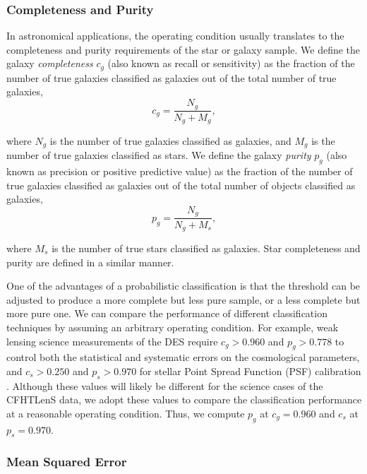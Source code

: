\documentclass[fleqn,usenatbib]{mnras}
\begin{document}
\subsubsection{Completeness and Purity}

In astronomical applications,
the operating condition usually translates to
the completeness and purity requirements of the star or galaxy sample.
We define the galaxy \textit{completeness}
$c_g$ (also known as recall or sensitivity) as
the fraction of the number of true galaxies classified as galaxies
out of the total number of true galaxies,
\begin{equation}
c_g = \frac{N_g}{N_g + M_g},
\end{equation}

\noindent
where $N_g$ is the number of true galaxies classified as galaxies,
and $M_g$ is the number of true galaxies classified as stars.
We define the galaxy \textit{purity} $p_g$ (also known as precision
or positive predictive value)
as the fraction of the number of true galaxies classified as galaxies
out of the total number of objects classified as galaxies, 
\begin{equation}
p_g = \frac{N_g}{N_g + M_s},
\end{equation}

\noindent
where $M_s$ is the number of true stars classified as galaxies.
Star completeness and purity are defined in a similar manner.


One of the advantages of a probabilistic classification is
that the threshold can be adjusted to produce
a more complete but less pure sample,
or a less complete but more pure one.
We can compare the performance of different classification techniques
by assuming an arbitrary operating condition.
For example, weak lensing science measurements
of the DES require $c_g > 0.960$ and $p_g > 0.778$
to control both the statistical and systematic errors
on the cosmological parameters,
and $c_s > 0.250$ and $p_s > 0.970$
for stellar Point Spread Function (PSF) calibration
\citep{soumagnac2013star}.
Although these values will likely be different
for the science cases of the CFHTLenS data,
we adopt these values to compare the classification performance
at a reasonable operating condition.
Thus, we compute $p_{g}$ at $c_g=0.960$
and $c_{s}$ at $p_s=0.970$.

\subsubsection{Mean Squared Error}
\end{document}
